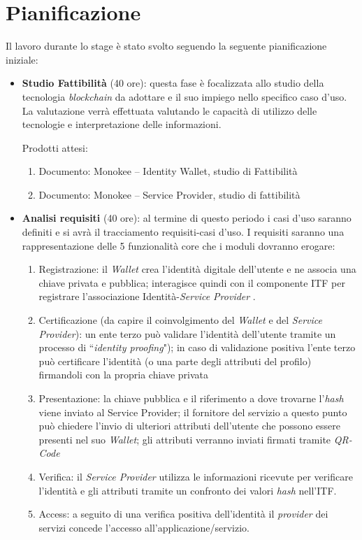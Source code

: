 \section{Pianificazione}
Il lavoro durante lo stage è stato svolto seguendo la seguente pianificazione iniziale:
\begin{itemize}
    

\item \textbf{Studio Fattibilità} (40 ore): questa fase è focalizzata allo studio della tecnologia \emph{blockchain} da adottare e il suo impiego nello specifico caso d’uso.  La valutazione verrà effettuata valutando le capacità di utilizzo delle tecnologie e interpretazione delle informazioni.

    Prodotti attesi: 
    \begin{enumerate}
        \item Documento: Monokee – Identity Wallet, studio di Fattibilità
        \item Documento: Monokee – Service Provider, studio di fattibilità
    \end{enumerate}
        

\item \textbf{Analisi requisiti} (40 ore): al termine di questo periodo i casi d'uso saranno definiti e si avrà il tracciamento requisiti-casi d'uso.
    I requisiti saranno una rappresentazione delle 5 funzionalità core che i moduli dovranno erogare:
    \begin{enumerate}
        \item Registrazione: il \emph{Wallet} crea l’identità digitale dell’utente e ne associa una chiave privata e pubblica; interagisce quindi con il componente ITF per registrare l’associazione Identità-\emph{Service Provider} . 
        \item Certificazione (da capire il coinvolgimento del \emph{Wallet} e del \emph{Service Provider}): un ente terzo può validare l’identità dell’utente tramite un processo di “\emph{identity proofing}");  in caso di validazione positiva l’ente terzo può certificare l’identità (o una parte degli attributi del profilo) firmandoli con la propria chiave privata
        \item Presentazione: la chiave pubblica e il riferimento a dove trovarne l’\emph{hash} viene inviato al Service Provider; il fornitore del servizio a questo punto può chiedere l’invio di ulteriori attributi dell’utente che possono essere presenti nel suo \emph{Wallet}; gli attributi verranno inviati firmati tramite \emph{QR-Code}
        \item Verifica: il \emph{Service Provider} utilizza le informazioni ricevute per verificare l’identità e gli attributi tramite un confronto dei valori \emph{hash} nell’ITF.
        \item Access: a seguito di una verifica positiva dell’identità il \emph{provider} dei servizi concede l’accesso all’applicazione/servizio.
    \end{enumerate}
    

\end{itemize}

